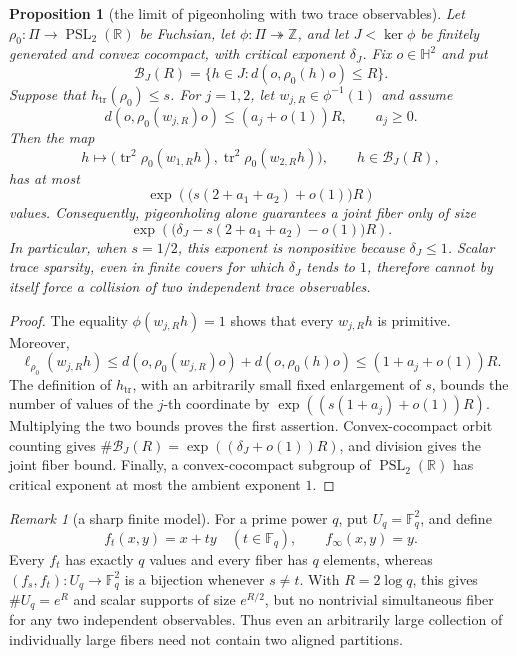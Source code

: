 \documentclass[11pt,reqno]{amsart}
\newtheorem{proposition}[theorem]{Proposition}
\theoremstyle{definition}
\theoremstyle{remark}
\newtheorem{remark}[theorem]{Remark}
\newcommand{\R}{\mathbb R}
\newcommand{\Z}{\mathbb Z}
\newcommand{\Tr}{\operatorname{tr}}
\newcommand{\PSL}{\operatorname{PSL}}
\begin{document}
\begin{proposition}[the limit of pigeonholing with two trace observables]
\label{prop:two-observable-budget}
Let \(\rho_0\colon\Pi\to\PSL_2(\R)\) be Fuchsian, let
\(\phi\colon\Pi\twoheadrightarrow\Z\), and let
\(J<\ker\phi\) be finitely generated and convex cocompact, with critical
exponent \(\delta_J\).  Fix \(o\in\mathbb H^2\) and put
\[
 \mathcal B_J(R)=\{h\in J:d(o,\rho_0(h)o)\le R\}.
\]
Suppose that \(h_{\Tr}(\rho_0)\le s\).  For \(j=1,2\), let
\(w_{j,R}\in\phi^{-1}(1)\) and assume
\[
 d(o,\rho_0(w_{j,R})o)\le(a_j+o(1))R,
 \qquad a_j\ge0.
\]
Then the map
\[
 h\longmapsto
 \bigl(\Tr^2\rho_0(w_{1,R}h),
       \Tr^2\rho_0(w_{2,R}h)\bigr),
 \qquad h\in\mathcal B_J(R),
\]
has at most
\[
 \exp\!\left(\bigl(s(2+a_1+a_2)+o(1)\bigr)R\right)
\]
values.  Consequently, pigeonholing alone guarantees a joint fiber only
of size
\[
 \exp\!\left(
   \bigl(\delta_J-s(2+a_1+a_2)-o(1)\bigr)R\right).
\]
In particular, when \(s=1/2\), this exponent is nonpositive because
\(\delta_J\le1\).  Scalar trace sparsity, even in finite covers for which
\(\delta_J\) tends to \(1\), therefore cannot by itself force a collision
of two independent trace observables.
\end{proposition}

\begin{proof}
The equality \(\phi(w_{j,R}h)=1\) shows that every \(w_{j,R}h\) is
primitive.  Moreover,
\[
 \ell_{\rho_0}(w_{j,R}h)
 \le d(o,\rho_0(w_{j,R})o)+d(o,\rho_0(h)o)
 \le(1+a_j+o(1))R.
\]
The definition of \(h_{\Tr}\), with an arbitrarily small fixed enlargement
of \(s\), bounds the number of values of the \(j\)-th coordinate by
\(\exp((s(1+a_j)+o(1))R)\).  Multiplying the two bounds proves the first
assertion.  Convex-cocompact orbit counting gives
\(\#\mathcal B_J(R)=\exp((\delta_J+o(1))R)\), and division gives the joint
fiber bound.  Finally, a convex-cocompact subgroup of
\(\PSL_2(\R)\) has critical exponent at most the ambient exponent \(1\).
\end{proof}

\begin{remark}[a sharp finite model]
For a prime power \(q\), put \(U_q=\mathbb F_q^2\), and define
\[
 f_t(x,y)=x+ty\quad(t\in\mathbb F_q),\qquad
 f_\infty(x,y)=y.
\]
Every \(f_t\) has exactly \(q\) values and every fiber has \(q\) elements,
whereas
\((f_s,f_t)\colon U_q\to\mathbb F_q^2\) is a bijection whenever
\(s\ne t\).  With \(R=2\log q\), this gives
\(\#U_q=e^R\) and scalar supports of size \(e^{R/2}\), but no nontrivial
simultaneous fiber for any two independent observables.  Thus even an
arbitrarily large collection of individually large fibers need not contain
two aligned partitions.
\end{remark}
\end{document}
